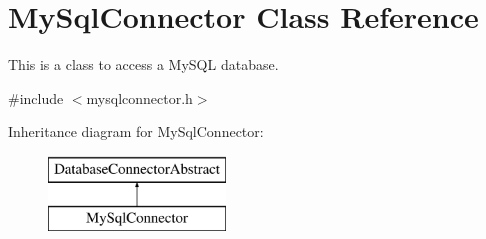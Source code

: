 \hypertarget{classMySqlConnector}{}\section{My\+Sql\+Connector Class Reference}
\label{classMySqlConnector}


This is a class to access a My\+S\+QL database.  




{\ttfamily \#include $<$mysqlconnector.\+h$>$}

Inheritance diagram for My\+Sql\+Connector\+:\begin{figure}[H]
\begin{center}
\leavevmode
\includegraphics[height=2.000000cm]{classMySqlConnector}
\end{center}
\end{figure}
